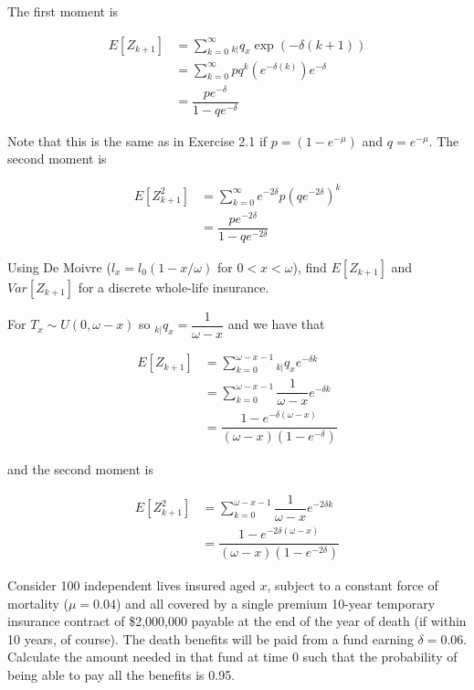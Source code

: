 \documentclass[12pt]{article}
\numberwithin{questioncounter}{section}
\begin{document}
\begin{solution}
The first moment is

\begin{align*}
E[Z_{k+1}] &= \sum_{k=0}^{\infty} {}_{k|}q_{x} \exp\left(-\delta(k+1)\right) \\
&= \sum_{k=0}^{\infty} pq^{k} (e^{-\delta(k)}) e^{-\delta} \\
&= \dfrac{pe^{-\delta}}{1 - qe^{-\delta}}
\end{align*}

Note that this is the same as in Exercise 2.1 if $p = (1 - e^{-\mu})$ and $q = e^{-\mu}$. The second moment is

\begin{align*}
E[Z_{k+1}^{2}] &= \sum_{k=0}^{\infty} e^{-2\delta} p(qe^{-2\delta})^{k} \\
&= \dfrac{pe^{-2\delta}}{1- qe^{-2\delta}}
\end{align*}

\end{solution}

\begin{question}
Using De Moivre ($l_{x} = l_{0} (1 - x/\omega)$ for $0 < x < \omega$), find $E[Z_{k+1}]$ and $Var[Z_{k+1}]$ for a discrete whole-life insurance.
\end{question}

\begin{solution}
For $T_{x} \sim U(0, \omega - x)$ so ${}_{k|}q_{x} = \dfrac{1}{\omega - x}$ and we have that

\begin{align*}
E[Z_{k+1}] &= \sum_{k=0}^{\omega - x - 1} {}_{k|}q_{x} e^{-\delta k} \\
&= \sum_{k=0}^{\omega - x - 1} \dfrac{1}{\omega - x} e^{-\delta k} \\
&= \dfrac{1 - e^{-\delta (\omega - x)}}{(\omega - x) (1 - e^{-\delta})}
\end{align*}

and the second moment is

\begin{align*}
E[Z_{k+1}^{2}] &= \sum_{k=0}^{\omega - x - 1} \dfrac{1}{\omega - x} e^{-2\delta k} \\
&= \dfrac{1 - e^{-2\delta (\omega - x)}}{(\omega - x)(1 - e^{-2\delta})}
\end{align*}

\end{solution}

\begin{question}
Consider 100 independent lives insured aged $x$, subject to a constant force of mortality ($\mu = 0.04$) and all covered by a single premium 10-year temporary insurance contract of \$2,000,000 payable at the end of the year of death (if within 10 years, of course). The death benefits will be paid from a fund earning $\delta = 0.06$. Calculate the amount needed in that fund at time 0 such that the probability of being able to pay all the benefits is 0.95.
\end{question}
\end{document}
